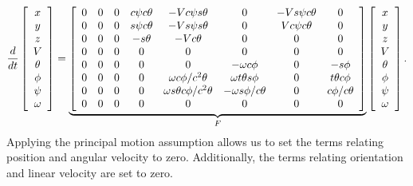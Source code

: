 {\footnotesize
\begin{align}
\label{eq:kfjacobianresult}
\frac{d}{dt}\left[\begin{array}{c}
x \\ y \\ z \\ V \\ \theta \\ \phi \\ \psi \\ \omega
\end{array}\right] =
\underbrace{\left[\begin{array}{c c c c c c c c}
0 & 0 & 0 & c\psi c\theta & -V c\psi s\theta               & 0                     & -V s\psi c\theta & 0 \\
0 & 0 & 0 & s\psi c\theta & -V s\psi s\theta               & 0                     & V c\psi c\theta  & 0 \\
0 & 0 & 0 & -s\theta      & -V c\theta                     & 0                     & 0                & 0 \\
0 & 0 & 0 & 0             & 0                              & 0                     & 0                & 0 \\
0 & 0 & 0 & 0             & 0                              & -\omega c\phi         & 0                & -s\phi \\
0 & 0 & 0 & 0             & \omega c\phi/c^2\theta         & \omega t\theta s\phi  & 0                & t\theta c\phi \\
0 & 0 & 0 & 0             & \omega s\theta c\phi/c^2\theta & -\omega s\phi/c\theta & 0                & c\phi/c\theta \\
0 & 0 & 0 & 0             & 0                              & 0                     & 0                & 0
\end{array}\right]}_{F}
\left[\begin{array}{c}
x \\ y \\ z \\ V \\ \theta \\ \phi \\ \psi \\ \omega
\end{array}\right].
\end{align}
}
Applying the principal motion assumption allows us to set the terms relating position and angular velocity to zero.
Additionally, the terms relating orientation and linear velocity are set to zero.
